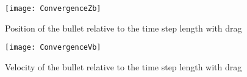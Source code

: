 \documentclass[a4paper,12pt]{article}
\newlength{\plotwidth} %
\begin{document}
\begin{figure}[p]
    \centering
    \texttt{[image: ConvergenceZb]}
    \caption{Position of the bullet relative to the time step length with drag}
    \label{fig:zb(dt)}
\end{figure}
\begin{figure}[p]
    \centering
    \texttt{[image: ConvergenceVb]}
    \caption{Velocity of the bullet relative to the time step length with drag}
    \label{fig:vb(dt)}
\end{figure}
\end{document}
